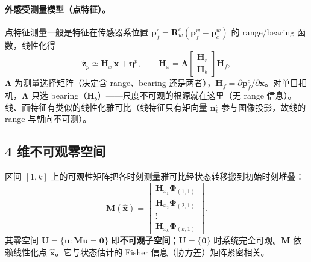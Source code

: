 \paragraph{外感受测量模型（点特征）。}
点特征测量一般是特征在传感器系位置 $\mathbf{p}_f^c=\mathbf{R}^c_w(\mathbf{p}_f^w-\mathbf{p}_c^w)$ 的 range/bearing 函数，线性化得
\begin{equation}
  \tilde{\mathbf{z}}_p\simeq\mathbf{H}_x\,\tilde{\boldsymbol{x}}+\boldsymbol{\eta}^p,
  \qquad
  \mathbf{H}_x=\boldsymbol{\Lambda}\begin{bmatrix}\mathbf{H}_r\\ \mathbf{H}_b\end{bmatrix}\mathbf{H}_f,
  \label{eq:vio-Hx}
\end{equation}
$\boldsymbol{\Lambda}$ 为测量选择矩阵（决定含 range、bearing 还是两者），$\mathbf{H}_f=\partial\mathbf{p}_f^c/\partial\boldsymbol{x}$。对单目相机，$\boldsymbol{\Lambda}$ 只选 bearing（$\mathbf{H}_b$）——尺度不可观的根源就在这里（无 range 信息）。线、面特征有类似的线性化雅可比（线特征只有矩向量 $\mathbf{n}_\ell^c$ 参与图像投影，故线的 range 与朝向不可测）。

\subsection{4 维不可观零空间}
\label{sec:vio-obs-null}

\begin{definition}[可观性矩阵与不可观子空间]\label{def:vio-obs-matrix}
区间 $[1,k]$ 上的可观性矩阵把各时刻测量雅可比经状态转移搬到初始时刻堆叠\cite{carlone2026handbook}：
\begin{equation}
  \mathbf{M}(\hat{\boldsymbol{x}})=\begin{bmatrix}
  \mathbf{H}_{x_1}\boldsymbol{\Phi}_{(1,1)}\\
  \mathbf{H}_{x_2}\boldsymbol{\Phi}_{(2,1)}\\
  \vdots\\
  \mathbf{H}_{x_k}\boldsymbol{\Phi}_{(k,1)}
  \end{bmatrix}.
  \label{eq:vio-obs-matrix}
\end{equation}
其零空间 $\mathbf{U}=\{\mathbf{u}:\mathbf{M}\mathbf{u}=\mathbf{0}\}$ 即\textbf{不可观子空间}；$\mathbf{U}=\{\mathbf{0}\}$ 时系统完全可观。$\mathbf{M}$ 依赖线性化点 $\hat{\boldsymbol{x}}$。它与状态估计的 Fisher 信息（协方差）矩阵紧密相关。
\end{definition}


